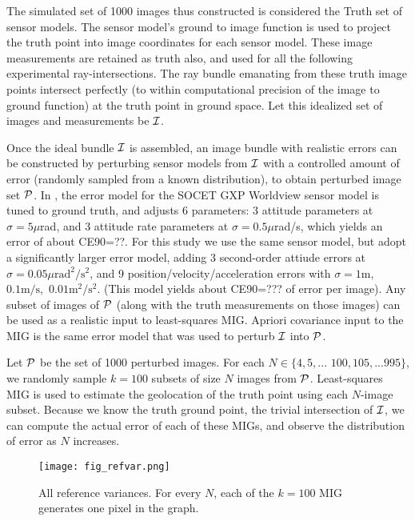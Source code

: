 \documentclass[10pt]{amsart}
\begin{document}
The simulated set of 1000 images thus constructed is considered the Truth set of
sensor models. The sensor model's ground to image function is used to project
the truth point into image coordinates for each sensor model. These image
measurements are retained as truth also, and used for all the following
experimental ray-intersections. The ray bundle emanating from these truth image
points intersect perfectly (to within computational precision of the image to
ground function) at the truth point in ground space. Let this idealized set of
images and measurements be $\mathcal{I}$.

Once the ideal bundle $\mathcal{I}$ is assembled, an image bundle with realistic
errors can be constructed by perturbing sensor models from $\mathcal{I}$ with a
controlled amount of error (randomly sampled from a known distribution), to
obtain perturbed image set $\mathcal{P}$. In \cite{MIN}, the error model for the SOCET
GXP Worldview sensor model is tuned to ground truth, and adjusts 6 parameters: 3
attitude parameters at $\sigma=5\mu$rad, and 3 attitude rate parameters at
$\sigma=0.5\mu$rad/s, which yields an error of about CE90=??. For this study we
use the same sensor model, but adopt a significantly larger error model, adding
3 second-order attiude errors at $\sigma=0.05\mu\mathrm{rad}^2/\mathrm{s}^2$,
and 9 position/velocity/ac\-cel\-eration errors with $\sigma = 1{\mathrm m},$
$0.1{\mathrm m}/{\mathrm s},$ $0.01{\mathrm m}^2/{\mathrm s}^2$. (This model
yields about CE90=??? of error per image). Any subset of images of $\mathcal{P}$
(along with the truth measurements on those images) can be used as a realistic
input to least-squares MIG. Apriori covariance input to the MIG is the same
error model that was used to perturb $\mathcal{I}$ into $\mathcal{P}$.

Let $\mathcal{P}$ be the set of 1000 perturbed images. For each
$N\in\{4,5,...$ $100,105,...995\}$, we randomly sample $k=100$ subsets of size
$N$ images from $\mathcal{P}$. Least-squares MIG is used to estimate the geolocation
of the truth point using each $N$-image subset. Because we know the truth ground
point, the trivial intersection of $\mathcal{I}$, we can compute the actual error of
each of these MIGs, and observe the distribution of error as $N$ increases.

\begin{figure}
\texttt{[image: fig\_refvar.png]}
\caption{\label{fig:vanillaref}All reference variances. For every $N$, each of
  the $k=100$ MIG generates one pixel in the graph.}
\end{figure}
\end{document}
